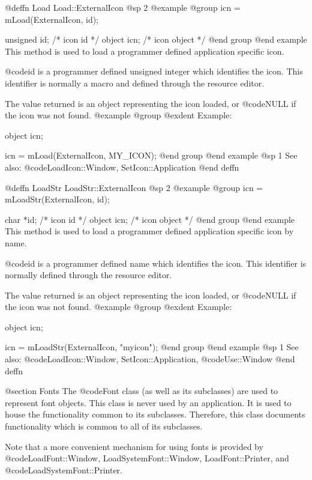 @deffn {Load} Load::ExternalIcon
@sp 2
@example
@group
icn = mLoad(ExternalIcon, id);

unsigned id;    /*  icon id      */
object   icn;   /*  icon object  */
@end group
@end example
This method is used to load a programmer defined application specific
icon.

@code{id} is a programmer defined unsigned integer which identifies
the icon.  This identifier is normally a macro and defined through the
resource editor.  

The value returned is an object representing the icon loaded, or
@code{NULL} if the icon was not found.
@example
@group
@exdent Example:

object  icn;

icn = mLoad(ExternalIcon, MY_ICON);
@end group
@end example
@sp 1
See also:  @code{LoadIcon::Window, SetIcon::Application}
@end deffn











@deffn {LoadStr} LoadStr::ExternalIcon
@sp 2
@example
@group
icn = mLoadStr(ExternalIcon, id);

char    *id;    /*  icon id      */
object   icn;   /*  icon object  */
@end group
@end example
This method is used to load a programmer defined application specific
icon by name.

@code{id} is a programmer defined name which identifies the icon.
This identifier is normally defined through the resource editor.

The value returned is an object representing the icon loaded, or
@code{NULL} if the icon was not found.
@example
@group
@exdent Example:

object  icn;

icn = mLoadStr(ExternalIcon, "myicon");
@end group
@end example
@sp 1
See also:  @code{LoadIcon::Window, SetIcon::Application,}
        @code{Use::Window}
@end deffn





@section Fonts
The @code{Font} class (as well as its subclasses) are used to represent
font objects.  This class is never used by an application.  It is used
to house the functionality common to its subclasses.  Therefore, this
class documents functionality which is common to all of its subclasses.

Note that a more convenient mechanism for using fonts is provided by
@code{LoadFont::Window, LoadSystemFont::Window, LoadFont::Printer},
and @code{LoadSystemFont::Printer}.










